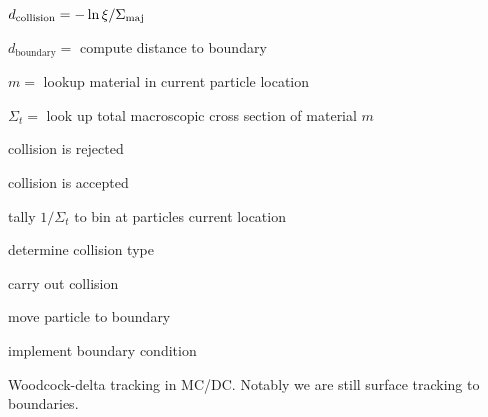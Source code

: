 \begin{algorithm}
\begin{algorithmic}[1]

    
        \State $d_{\text{collision}} = -\ln{\xi} / \Sigma_{\text{maj}} $
        
        \State $d_{\text{boundary}} =$ compute distance to boundary


            \State $m =$ lookup material in current particle location
            
            \State $\Sigma_{t} =$ look up total macroscopic cross section of material $m$ 


                \State collision is rejected

             \Else 
            
                \State collision is accepted

                \State tally $1/\Sigma_t$ to bin at particles current location

                \State determine collision type 
                
                \State carry out collision
                
            \EndIf
                
        \Else 
        
            \State move particle to boundary

            \State implement boundary condition
        \EndIf
        
    \EndWhile
    
    \vspace{1.5em}
    \caption{Woodcock-delta tracking in MC/DC. Notably we are still surface tracking to boundaries.}
    \label{alg:trad}
\end{algorithmic}
\end{algorithm}

